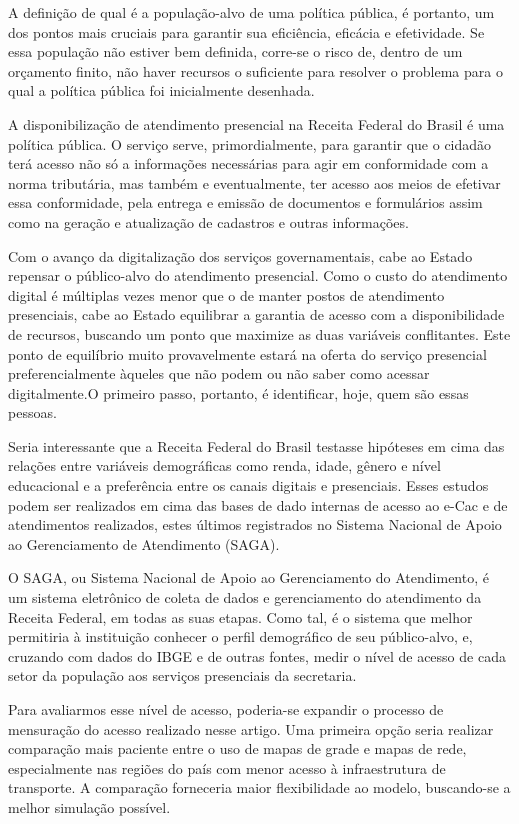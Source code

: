 \documentclass[]{article}
\begin{document}
A definição de qual é a população-alvo de uma política pública, é
portanto, um dos pontos mais cruciais para garantir sua eficiência,
eficácia e efetividade. Se essa população não estiver bem definida,
corre-se o risco de, dentro de um orçamento finito, não haver recursos o
suficiente para resolver o problema para o qual a política pública foi
inicialmente desenhada.

A disponibilização de atendimento presencial na Receita Federal do
Brasil é uma política pública. O serviço serve, primordialmente, para
garantir que o cidadão terá acesso não só a informações necessárias para
agir em conformidade com a norma tributária, mas também e eventualmente,
ter acesso aos meios de efetivar essa conformidade, pela entrega e
emissão de documentos e formulários assim como na geração e atualização
de cadastros e outras informações.

Com o avanço da digitalização dos serviços governamentais, cabe ao
Estado repensar o público-alvo do atendimento presencial. Como o custo
do atendimento digital é múltiplas vezes menor que o de manter postos de
atendimento presenciais, cabe ao Estado equilibrar a garantia de acesso
com a disponibilidade de recursos, buscando um ponto que maximize as
duas variáveis conflitantes. Este ponto de equilíbrio muito
provavelmente estará na oferta do serviço presencial preferencialmente
àqueles que não podem ou não saber como acessar digitalmente.O primeiro
passo, portanto, é identificar, hoje, quem são essas pessoas.

Seria interessante que a Receita Federal do Brasil testasse hipóteses em
cima das relações entre variáveis demográficas como renda, idade, gênero
e nível educacional e a preferência entre os canais digitais e
presenciais. Esses estudos podem ser realizados em cima das bases de
dado internas de acesso ao e-Cac e de atendimentos realizados, estes
últimos registrados no Sistema Nacional de Apoio ao Gerenciamento de
Atendimento (SAGA).

O SAGA, ou Sistema Nacional de Apoio ao Gerenciamento do Atendimento, é
um sistema eletrônico de coleta de dados e gerenciamento do atendimento
da Receita Federal, em todas as suas etapas. Como tal, é o sistema que
melhor permitiria à instituição conhecer o perfil demográfico de seu
público-alvo, e, cruzando com dados do IBGE e de outras fontes, medir o
nível de acesso de cada setor da população aos serviços presenciais da
secretaria.

Para avaliarmos esse nível de acesso, poderia-se expandir o processo de
mensuração do acesso realizado nesse artigo. Uma primeira opção seria
realizar comparação mais paciente entre o uso de mapas de grade e mapas
de rede, especialmente nas regiões do país com menor acesso à
infraestrutura de transporte. A comparação forneceria maior
flexibilidade ao modelo, buscando-se a melhor simulação possível.
\end{document}
